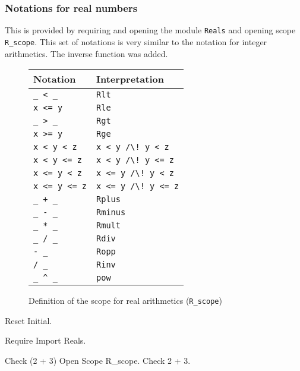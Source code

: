 \subsubsection[Notations for real numbers]{Notations for real numbers}

This is provided by requiring and opening the module {\tt Reals} and
opening scope {\tt R\_scope}. This set of notations is very similar to
the notation for integer arithmetics. The inverse function was added.
\begin{figure}
\begin{center}
\begin{tabular}{l|l}
Notation & Interpretation \\
\hline
\verb!_ < _! & {\tt Rlt} \\
\verb!x <= y! & {\tt Rle} \\
\verb!_ > _! & {\tt Rgt} \\
\verb!x >= y! & {\tt Rge} \\
\verb!x < y < z! & {\tt x < y \verb!/\! y < z} \\
\verb!x < y <= z! & {\tt x < y \verb!/\! y <= z} \\
\verb!x <= y < z! & {\tt x <= y \verb!/\! y < z} \\
\verb!x <= y <= z! & {\tt x <= y \verb!/\! y <= z} \\
\verb!_ + _! & {\tt Rplus} \\
\verb!_ - _! & {\tt Rminus} \\
\verb!_ * _! & {\tt Rmult} \\
\verb!_ / _! & {\tt Rdiv} \\
\verb!- _!  & {\tt Ropp} \\
\verb!/ _!  & {\tt Rinv} \\
\verb!_ ^ _! & {\tt pow} \\
\end{tabular}
\end{center}
\label{reals-syntax}
\caption{Definition of the scope for real arithmetics ({\tt R\_scope})}
\end{figure}

\begin{coq_eval}
Reset Initial.
\end{coq_eval}
\begin{coq_example*}
Require Import Reals.
\end{coq_example*}
\begin{coq_example}
Check  (2 + 3)%
Open Scope R_scope.
Check 2 + 3.
\end{coq_example}

